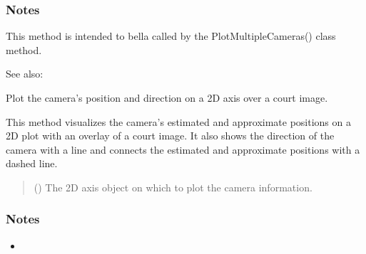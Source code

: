 \documentclass[letterpaper,10pt,english]{sphinxmanual}
\begin{document}
\begin{fulllineitems}
\begin{fulllineitems}
\subsubsection*{Notes}

\sphinxAtStartPar
This method is intended to bella called by the PlotMultipleCameras() class method.


\begin{sphinxseealso}{See also:}

\sphinxAtStartPar
{\hyperref[\detokenize{CameraUtils:id18}]{}}


\end{sphinxseealso}


\end{fulllineitems}


\begin{fulllineitems}
\label{\detokenize{CameraUtils:id17}}
\pysigstartsignatures
{}
\pysigstopsignatures
\sphinxAtStartPar
Plot the camera’s position and direction on a 2D axis over a court image.

\sphinxAtStartPar
This method visualizes the camera’s estimated and approximate positions on a 2D plot
with an overlay of a court image. It also shows the direction of the camera with a line
and connects the estimated and approximate positions with a dashed line.
\begin{quote}\begin{description}
\sphinxAtStartPar
{} () \textendash{} The 2D axis object on which to plot the camera information.

\end{description}\end{quote}
\subsubsection*{Notes}
\begin{itemize}
\item {} 
\sphinxAtStartPar
{}


\end{itemize}
\end{fulllineitems}
\end{fulllineitems}
\end{document}
